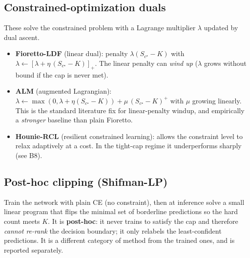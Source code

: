 \documentclass[11pt,a4paper]{article}
\begin{document}
\subsection{Constrained-optimization duals}
These solve the constrained problem with a Lagrange multiplier $\lambda$ updated by dual ascent.
\begin{itemize}
\item \textbf{Fioretto-LDF} (linear dual): penalty $\lambda(S_{c^\star}-K)$ with
$\lambda \leftarrow [\lambda + \eta\,(S_{c^\star}-K)]_+$. The linear penalty can \emph{wind up} ($\lambda$
grows without bound if the cap is never met).
\item \textbf{ALM} (augmented Lagrangian): $\lambda \leftarrow \max(0,\lambda+\eta(S_{c^\star}-K)) +
\mu\,(S_{c^\star}-K)^+$ with $\mu$ growing linearly. This is the standard literature fix for linear-penalty
windup, and empirically a \emph{stronger} baseline than plain Fioretto.
\item \textbf{Hounie-RCL} (resilient constrained learning): allows the constraint level to relax adaptively at
a cost. In the tight-cap regime it underperforms sharply (see B8).
\end{itemize}

\subsection{Post-hoc clipping (Shifman-LP)}
Train the network with plain CE (no constraint), then at inference solve a small linear program that flips the
minimal set of borderline predictions so the hard count meets $K$. It is \textbf{post-hoc}: it never trains to
satisfy the cap and therefore \emph{cannot re-rank} the decision boundary; it only relabels the least-confident
predictions. It is a different category of method from the trained ones, and is reported separately.
\end{document}
